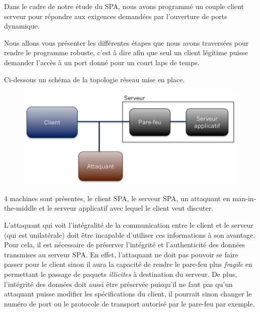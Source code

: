 Dans le cadre de notre étude du SPA, nous avons programmé un couple client serveur pour répondre aux exigences demandées par l'ouverture de ports dynamique.

Nous allons vous présenter les différentes étapes que nous avons traversées pour rendre le programme robuste, c'est à dire afin que seul un client légitime puisse demander l'accès à un port donné pour un court laps de temps.

Ci-dessous un schéma de la topologie réseau mise en place.
\begin{figure}[h]

\centerline{\includegraphics[scale=0.6]{topoSPA}}

\end{figure}

4 machines sont présentes, le client SPA, le serveur SPA, un attaquant en man-in-the-middle et le serveur applicatif avec lequel le client veut discuter.

L'attaquant qui voit l'intégralité de la communication entre le client et le serveur (qui est unilatérale) doit être incapable d'utiliser ces informations à son avantage.
Pour cela, il est nécessaire de préserver l'intégrité et l'authenticité des données transmises au serveur SPA. 
En effet, l'attaquant ne doit pas pouvoir se faire passer pour le client sinon il aura la capacité de rendre le pare-feu plus \emph{fragile} en permettant le passage de paquets \emph{illicites} à destination du serveur.
De plus, l'intégrité des données doit aussi être préservée puisqu'il ne faut pas qu'un attaquant puisse modifier les spécifications du client, il pourrait sinon changer le numéro de port ou le protocole de transport autorisé par le pare-feu par exemple. 
